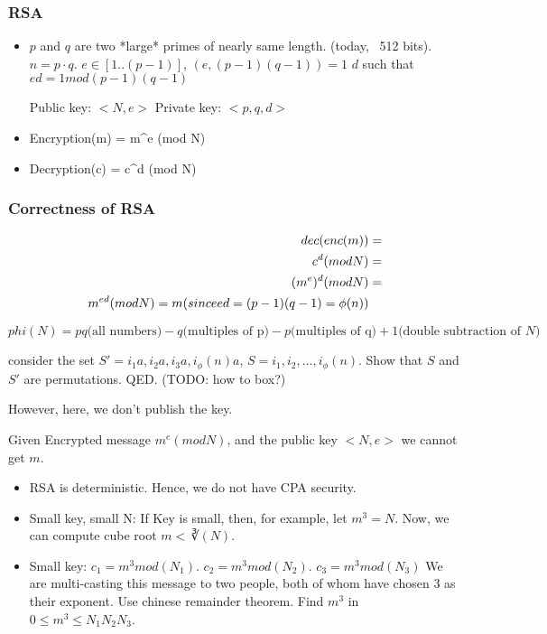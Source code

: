 \subsubsection{RSA}
\begin{itemize}
\item $p$ and $q$ are two *large* primes of nearly same length. (today, ~512 bits).
  $n = p \cdot q$. $e \in [1..(p-1)]$, $(e, (p - 1)(q - 1)) = 1$
  $d$ such that $ed = 1 mod (p - 1)(q - 1)$

  Public key: $<N, e>$
  Private key: $<p, q, d>$

\item Encryption(m) = m^e (mod N)
\item Decryption(c) = c^d (mod N)
\end{itemize}

\subsubsection{Correctness of RSA}
\begin{align}
  dec(enc(m)) &= \\
  c^d(mod N) &= \\
  (m^e)^d (mod N) &= \\
  m^{ed} (mod N)
  = m \text(since ed = (p - 1)(q - 1) = \phi(n))
\end{align}

$phi(N) = pq \text{(all numbers)} - q \text{(multiples of p)} - p \text{(multiples of q)} + 1 \text{(double subtraction of $N$)}$

consider the set $S' = {i_1 a , i_2 a, i_3 a, i_\phi(n) a}$, $S = {i_1, i_2, ..., i_\phi(n)}$.
Show that $S$ and $S'$ are permutations.
QED. (TODO: how to box?)


However, here, we don't publish the key.


Given Encrypted message $m^e (mod N)$, and the public key $<N, e>$ we cannot get $m$.


\begin{itemize}
\item RSA is deterministic. Hence, we do not have CPA security.
\item Small key, small N: If Key is small, then, for example, let $m^3 = N$. Now, we can compute cube root $m < \cuberoot(N)$.
\item Small key:  $c_1 = m^3 mod (N_1)$. $c_2 = m^3 mod (N_2)$. $c_3 = m^3 mod (N_3)$ We are multi-casting
  this message to two people, both of whom have chosen $3$ as their exponent.
  Use chinese remainder theorem. Find $m^3$ in $0 \leq m^3 \leq N_1N_2N_3$.
\end{itemize}

